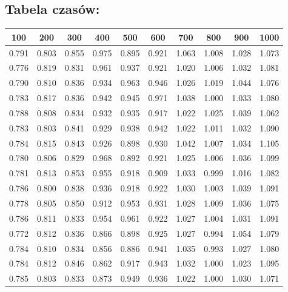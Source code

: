 \subsection{Tabela czasów: }
\begin{table}[!ht]
  \centering
  \begin{tabular}{|c|c|c|c|c|c|c|c|c|c|}
  \hline
      100 & 200 & 300 & 400 & 500 & 600 & 700 & 800 & 900 & 1000 \\ \hline \hline
      0.791 & 0.803 & 0.855 & 0.975 & 0.895 & 0.921 & 1.063 & 1.008 & 1.028 & 1.073 \\ \hline
      0.776 & 0.819 & 0.831 & 0.961 & 0.937 & 0.921 & 1.020 & 1.006 & 1.032 & 1.081 \\ \hline
      0.790 & 0.810 & 0.836 & 0.934 & 0.963 & 0.946 & 1.026 & 1.019 & 1.044 & 1.076 \\ \hline
      0.783 & 0.817 & 0.836 & 0.942 & 0.945 & 0.971 & 1.038 & 1.000 & 1.033 & 1.080 \\ \hline
      0.788 & 0.808 & 0.834 & 0.932 & 0.935 & 0.917 & 1.022 & 1.025 & 1.039 & 1.062 \\ \hline
      0.783 & 0.803 & 0.841 & 0.929 & 0.938 & 0.942 & 1.022 & 1.011 & 1.032 & 1.090 \\ \hline
      0.784 & 0.815 & 0.843 & 0.926 & 0.898 & 0.930 & 1.042 & 1.007 & 1.034 & 1.105 \\ \hline
      0.780 & 0.806 & 0.829 & 0.968 & 0.892 & 0.921 & 1.025 & 1.006 & 1.036 & 1.099 \\ \hline
      0.781 & 0.813 & 0.853 & 0.955 & 0.918 & 0.909 & 1.033 & 0.999 & 1.016 & 1.082 \\ \hline
      0.786 & 0.800 & 0.838 & 0.936 & 0.918 & 0.922 & 1.030 & 1.003 & 1.039 & 1.091 \\ \hline
      0.778 & 0.805 & 0.850 & 0.912 & 0.953 & 0.931 & 1.028 & 1.009 & 1.036 & 1.075 \\ \hline
      0.786 & 0.811 & 0.833 & 0.954 & 0.961 & 0.922 & 1.027 & 1.004 & 1.031 & 1.091 \\ \hline
      0.772 & 0.812 & 0.836 & 0.866 & 0.898 & 0.925 & 1.027 & 0.994 & 1.054 & 1.079 \\ \hline
      0.784 & 0.810 & 0.834 & 0.856 & 0.886 & 0.941 & 1.035 & 0.993 & 1.027 & 1.080 \\ \hline
      0.784 & 0.812 & 0.846 & 0.862 & 0.917 & 0.943 & 1.032 & 1.000 & 1.023 & 1.095 \\ \hline
      0.785 & 0.803 & 0.833 & 0.873 & 0.949 & 0.936 & 1.022 & 1.000 & 1.030 & 1.071 \\ \hline

\end{tabular}
\end{table}
